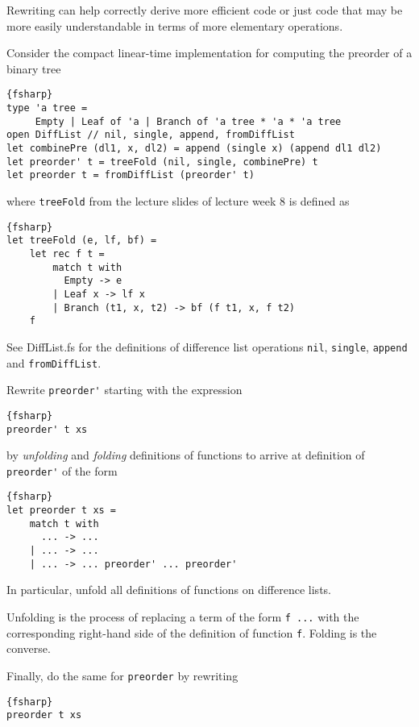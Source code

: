 Rewriting can help correctly derive more efficient code or just code that may be more easily understandable in terms of more elementary operations.

Consider the compact linear-time implementation for computing the preorder of a binary tree
\begin{lstlisting}{fsharp}
type 'a tree = 
     Empty | Leaf of 'a | Branch of 'a tree * 'a * 'a tree
open DiffList // nil, single, append, fromDiffList
let combinePre (dl1, x, dl2) = append (single x) (append dl1 dl2)
let preorder' t = treeFold (nil, single, combinePre) t
let preorder t = fromDiffList (preorder' t)
\end{lstlisting}
where \verb|treeFold| from the lecture slides of lecture week 8 is defined as
\begin{lstlisting}{fsharp}
let treeFold (e, lf, bf) =
    let rec f t = 
        match t with
          Empty -> e
        | Leaf x -> lf x
        | Branch (t1, x, t2) -> bf (f t1, x, f t2)
    f
\end{lstlisting}
See DiffList.fs for the definitions of difference list operations \verb|nil|, \verb|single|, \verb|append| and \verb|fromDiffList|.

Rewrite \verb|preorder'| starting with the expression
\begin{lstlisting}{fsharp}
preorder' t xs
\end{lstlisting}
by \emph{unfolding} and \emph{folding} definitions of functions to arrive at definition of \verb|preorder'| of the form
\begin{lstlisting}{fsharp}
let preorder t xs =
    match t with 
      ... -> ... 
    | ... -> ...
    | ... -> ... preorder' ... preorder'
\end{lstlisting}
In particular, unfold all definitions of functions on difference lists.

Unfolding is the process of replacing a term of the form \verb|f ...| with the corresponding right-hand side of the definition of function \verb|f|.
Folding is the converse.

Finally, do the same for \verb|preorder| by rewriting
\begin{lstlisting}{fsharp}
preorder t xs
\end{lstlisting}

